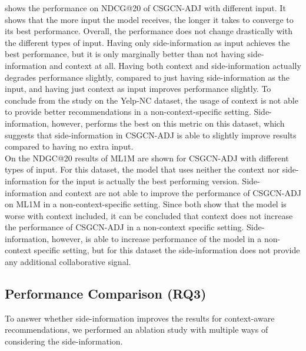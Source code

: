  shows the performance on NDCG@20 of CSGCN-ADJ with different input.
It shows that the more input the model receives, the longer it takes to converge to its best performance.
Overall, the performance does not change drastically with the different types of input.
Having only side-information as input achieves the best performance, but it is only marginally better than not having side-information and context at all.
Having both context and side-information actually degrades performance slightly, compared to just having side-information as the input, and having just context as input improves performance slightly.
To conclude from the study on the Yelp-NC dataset, the usage of context is not able to provide better recommendations in a non-context-specific setting.
Side-information, however, performs the best on this metric on this dataset, which suggests that side-information in CSGCN-ADJ is able to slightly improve results compared to having no extra input.
\\
On  the NDGC@20 results of ML1M are shown for CSGCN-ADJ with different types of input. 
For this dataset, the model that uses neither the context nor side-information for the input is actually the best performing version.
Side-information and context are not able to improve the performance of CSGCN-ADJ on ML1M in a non-context-specific setting.
Since both  show that the model is worse with context included, it can be concluded that context does not increase the performance of CSGCN-ADJ in a non-context specific setting.
Side-information, however, is able to increase performance of the model in a non-context specific setting, but for this dataset the side-information does not provide any additional collaborative signal.

\subsection{Performance Comparison (RQ3)}
To answer whether side-information improves the results for context-aware recommendations, we performed an ablation study with multiple ways of considering the side-information.
